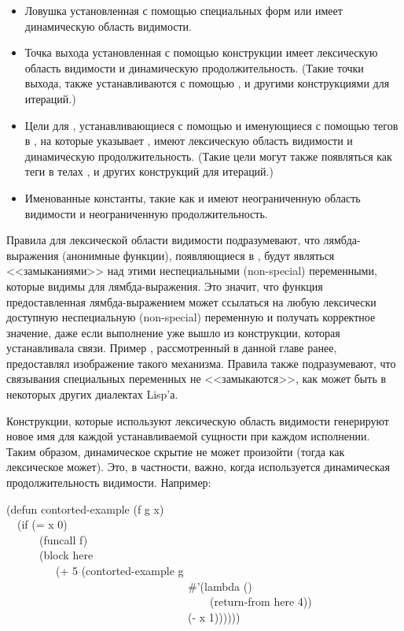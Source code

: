 \begin{itemize}
\item Ловушка установленная с помощью специальных форм  или
   имеет динамическую область видимости.

\item Точка выхода установленная с помощью конструкции  имеет лексическую
  область видимости и динамическую продолжительность. (Такие точки выхода, также
  устанавливаются с помощью ,  и другими конструкциями для итераций.)

\item Цели для , устанавливающиеся с помощью  и именующиеся с
  помощью тегов в , на которые указывает , имеют лексическую
  область видимости и динамическую продолжительность. (Такие  цели могут
  также появляться как теги в телах ,  и других конструкций для итераций.)

\item Именованные константы, такие как  и  имеют неограниченную область
  видимости и неограниченную продолжительность.
\end{itemize}

Правила для лексической области видимости подразумевают, что лямбда-выражения
(анонимные функции), появляющиеся в , будут 
являться <<замыканиями>> над этими неспециальными (non-special) переменными,
которые видимы для лямбда-выражения.
Это значит, что функция предоставленная лямбда-выражением может ссылаться на
любую лексически доступную неспециальную (non-special) переменную и получать
корректное значение, даже если выполнение уже вышло из конструкции, которая
устанавливала связи.
Пример , рассмотренный в данной главе ранее, предоставлял
изображение такого механизма.
Правила также подразумевают, что связывания специальных переменных не
<<замыкаются>>, как может быть в некоторых других диалектах Lisp'а.

Конструкции, которые используют лексическую область видимости генерируют новое имя
для каждой устанавливаемой сущности при каждом исполнении.
Таким образом, динамическое скрытие не может произойти (тогда как лексическое
может).
Это, в частности, важно, когда используется динамическая продолжительность
видимости.
Например:

\begin{lisp}
(defun contorted-example (f g x) \\
~~(if (= x 0) \\
~~~~~~(funcall f) \\
~~~~~~(block here \\
~~~~~~~~~(+ 5 (contorted-example g \\
~~~~~~~~~~~~~~~~~~~~~~~~~~~~~~~~~\#'(lambda () \\
~~~~~~~~~~~~~~~~~~~~~~~~~~~~~~~~~~~~~(return-from here 4)) \\
~~~~~~~~~~~~~~~~~~~~~~~~~~~~~~~~~(- x 1))))))
\end{lisp}


